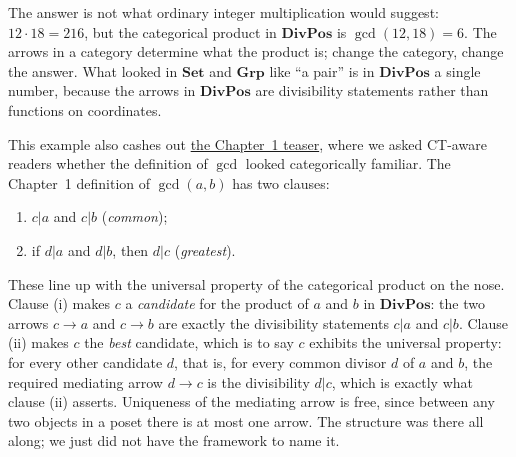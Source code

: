 \noindent The answer is not what ordinary integer multiplication
would suggest: $12 \cdot 18 = 216$, but the categorical product in
$\mathbf{DivPos}$ is $\gcd(12, 18) = 6$. The arrows in a category
determine what the product is; change the category, change the
answer. What looked in $\mathbf{Set}$ and $\mathbf{Grp}$ like ``a
pair'' is in $\mathbf{DivPos}$ a single number, because the arrows
in $\mathbf{DivPos}$ are divisibility statements rather than
functions on coordinates.

\noindent This example also cashes out
\hyperref[note:ch1-gcd-teaser]{the Chapter~1 teaser}, where we
asked CT-aware readers whether the
definition of $\gcd$ looked categorically familiar. The Chapter~1
definition of $\gcd(a, b)$ has two clauses:
\begin{enumerate}[label=(\roman*)]
    \item $c | a$ and $c | b$ (\textit{common});
    \item if $d | a$ and $d | b$, then $d | c$ (\textit{greatest}).
\end{enumerate}
These line up with the universal property of the categorical product
on the nose. Clause (i) makes $c$ a \textit{candidate} for the
product of $a$ and $b$ in $\mathbf{DivPos}$: the two arrows
$c \to a$ and $c \to b$ are exactly the divisibility statements
$c | a$ and $c | b$. Clause (ii) makes $c$ the \textit{best}
candidate, which is to say $c$ exhibits the universal property: for
every other candidate $d$, that is, for every common divisor $d$ of
$a$ and $b$, the required mediating arrow $d \to c$ is the
divisibility $d | c$, which is exactly what clause (ii) asserts.
Uniqueness of the mediating arrow is free, since between any two
objects in a poset there is at most one arrow. The structure was
there all along; we just did not have the framework to name it.


